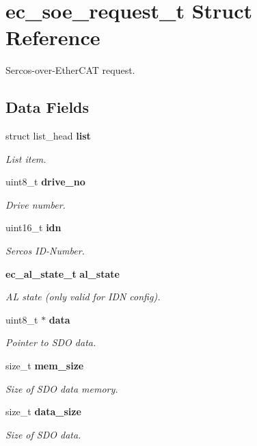 \section{ec\-\_\-soe\-\_\-request\-\_\-t Struct Reference}
\label{structec__soe__request__t}


Sercos-\/over-\/\-Ether\-C\-A\-T request.  


\subsection*{Data Fields}
\begin{DoxyCompactItemize}
\item 
struct list\-\_\-head {\bf list}
\begin{DoxyCompactList}\small\item\em List item. \end{DoxyCompactList}\item 
uint8\-\_\-t {\bf drive\-\_\-no}
\begin{DoxyCompactList}\small\item\em Drive number. \end{DoxyCompactList}\item 
uint16\-\_\-t {\bf idn}
\begin{DoxyCompactList}\small\item\em Sercos I\-D-\/\-Number. \end{DoxyCompactList}\item 
{\bf ec\-\_\-al\-\_\-state\-\_\-t} {\bf al\-\_\-state}
\begin{DoxyCompactList}\small\item\em A\-L state (only valid for I\-D\-N config). \end{DoxyCompactList}\item 
uint8\-\_\-t $\ast$ {\bf data}
\begin{DoxyCompactList}\small\item\em Pointer to S\-D\-O data. \end{DoxyCompactList}\item 
size\-\_\-t {\bf mem\-\_\-size}
\begin{DoxyCompactList}\small\item\em Size of S\-D\-O data memory. \end{DoxyCompactList}\item 
size\-\_\-t {\bf data\-\_\-size}
\begin{DoxyCompactList}\small\item\em Size of S\-D\-O data. \end{DoxyCompactList}\item 

\end{DoxyCompactItemize}
